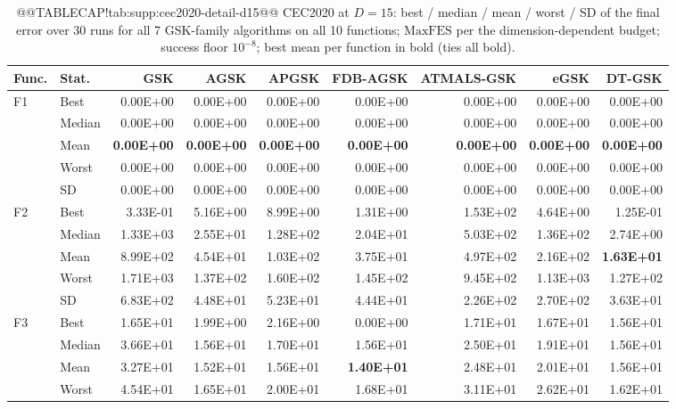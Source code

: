 \documentclass[10pt,a4paper]{article}
\newcommand{\bestval}[1]{\textbf{#1}}
\begin{document}
\begin{table}[p]
\caption{@@TABLECAP!tab:supp:cec2020-detail-d15@@ CEC2020 at $D = 15$: best / median / mean / worst / SD of
the final error over 30 runs for all 7 GSK-family algorithms
on all 10 functions;
$\mathrm{MaxFES}$ per the dimension-dependent budget; success floor
$10^{-8}$; best mean per function in bold (ties all bold).
}\label{tab:supp:cec2020-detail-d15}


\zebra
\begin{tabular}{llrrrrrrr}
\toprule
\textbf{Func.} & \textbf{Stat.} & \textbf{GSK} & \textbf{AGSK} & \textbf{APGSK} & \textbf{FDB-AGSK} & \textbf{ATMALS-GSK} & \textbf{eGSK} & \textbf{DT-GSK} \\
\midrule
F1 & Best & 0.00E+00 & 0.00E+00 & 0.00E+00 & 0.00E+00 & 0.00E+00 & 0.00E+00 & 0.00E+00 \\
 & Median & 0.00E+00 & 0.00E+00 & 0.00E+00 & 0.00E+00 & 0.00E+00 & 0.00E+00 & 0.00E+00 \\
 & Mean & \bestval{0.00E+00} & \bestval{0.00E+00} & \bestval{0.00E+00} & \bestval{0.00E+00} & \bestval{0.00E+00} & \bestval{0.00E+00} & \bestval{0.00E+00} \\
 & Worst & 0.00E+00 & 0.00E+00 & 0.00E+00 & 0.00E+00 & 0.00E+00 & 0.00E+00 & 0.00E+00 \\
 & SD & 0.00E+00 & 0.00E+00 & 0.00E+00 & 0.00E+00 & 0.00E+00 & 0.00E+00 & 0.00E+00 \\
\midrule
F2 & Best & 3.33E-01 & 5.16E+00 & 8.99E+00 & 1.31E+00 & 1.53E+02 & 4.64E+00 & 1.25E-01 \\
 & Median & 1.33E+03 & 2.55E+01 & 1.28E+02 & 2.04E+01 & 5.03E+02 & 1.36E+02 & 2.74E+00 \\
 & Mean & 8.99E+02 & 4.54E+01 & 1.03E+02 & 3.75E+01 & 4.97E+02 & 2.16E+02 & \bestval{1.63E+01} \\
 & Worst & 1.71E+03 & 1.37E+02 & 1.60E+02 & 1.45E+02 & 9.45E+02 & 1.13E+03 & 1.27E+02 \\
 & SD & 6.83E+02 & 4.48E+01 & 5.23E+01 & 4.44E+01 & 2.26E+02 & 2.70E+02 & 3.63E+01 \\
\midrule
F3 & Best & 1.65E+01 & 1.99E+00 & 2.16E+00 & 0.00E+00 & 1.71E+01 & 1.67E+01 & 1.56E+01 \\
 & Median & 3.66E+01 & 1.56E+01 & 1.70E+01 & 1.56E+01 & 2.50E+01 & 1.91E+01 & 1.56E+01 \\
 & Mean & 3.27E+01 & 1.52E+01 & 1.56E+01 & \bestval{1.40E+01} & 2.48E+01 & 2.01E+01 & 1.56E+01 \\
 & Worst & 4.54E+01 & 1.65E+01 & 2.00E+01 & 1.68E+01 & 3.11E+01 & 2.62E+01 & 1.62E+01 \\

\end{tabular}
\end{table}
\end{document}
